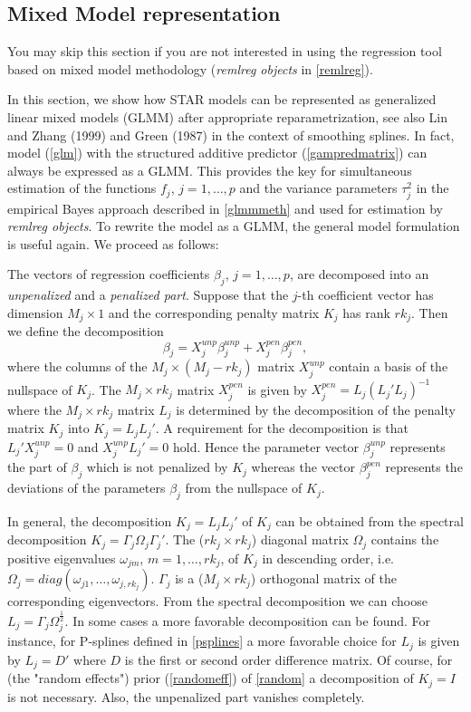 \subsection{Mixed Model representation}
\label{glmmrep}

You may skip this section if you are not interested in using the
regression tool based on mixed model methodology ({\em remlreg
objects} in \autoref{remlreg}).

In this section, we show how STAR models can be represented as
generalized linear mixed models (GLMM) after appropriate
reparametrization, see also Lin and Zhang (1999) and Green (1987)
in the context of smoothing splines. In fact, model (\ref{glm})
with the structured additive predictor (\ref{gampredmatrix}) can
always be expressed as a GLMM. This provides the key for
simultaneous estimation of the functions $f_j$, $j=1,\dots,p$ and
the variance parameters $\tau^2_j$ in the empirical Bayes approach
described in \autoref{glmmmeth} and used for estimation by {\em
remlreg objects}.  To rewrite the model as a GLMM, the general
model formulation is useful again. We proceed as follows:

The  vectors of regression coefficients $\beta_j$, $j=1,\dots,p$,
are decomposed into an {\em unpenalized} and a {\em penalized
part}. Suppose that the $j$-th coefficient vector has dimension
$M_j \times 1$ and the corresponding penalty matrix $K_j$ has rank
$rk_j$. Then we define the decomposition
\begin{equation}
\label{decompbeta} \beta_j = X_j^{unp} \beta_j^{unp} + X_j^{pen}
\beta_j^{pen},
\end{equation}
where the columns of the $M_j \times (M_j - rk_j)$ matrix
$X_j^{unp}$ contain a basis of the nullspace of $K_j$. The  $M_j
\times rk_j$ matrix $X_j^{pen}$ is given by $X_j^{pen} =
L_j(L_j'L_j)^{-1}$ where the $M_j \times rk_j$ matrix $L_j$ is
determined by the decomposition of the penalty matrix $K_j$ into
$K_j = L_jL_j'$. A requirement for the decomposition is that
$L_j'X_j^{unp} = 0$ and $X_j^{unp}L_j' = 0$ hold. Hence the
parameter vector $\beta_j^{unp}$ represents the part of $\beta_j$
which is not penalized by $K_j$ whereas the vector $\beta_j^{pen}$
represents the deviations of the parameters $\beta_j$ from the
nullspace of $K_j$.

In general, the decomposition $K_j=L_jL_j'$ of $K_j$ can be
obtained from the spectral decomposition $K_j = \Gamma_j \Omega_j
\Gamma_j'$. The ($rk_j \times rk_j$)  diagonal matrix $\Omega_j$
contains the positive eigenvalues $\omega_{jm}$, $m=1,\dots,rk_j$,
of $K_j$ in descending order, i.e. $\Omega_j =
diag(\omega_{j1},\dots,\omega_{j,rk_j})$. $\Gamma_j$ is a ($M_j
\times rk_j$) orthogonal matrix of the corresponding eigenvectors.
From the spectral decomposition we can choose $L_j = \Gamma_j
\Omega_j^{\frac{1}{2}}$. In some cases a more favorable
decomposition can be found. For instance, for P-splines defined in
\autoref{psplines} a more favorable choice for $L_j$ is given by
$L_j = D'$ where $D$ is the first or second order difference
matrix. Of course, for (the "random effects") prior
(\ref{randomeff}) of \autoref{random} a decomposition of $K_j=I$
is not necessary. Also, the unpenalized part vanishes completely.

